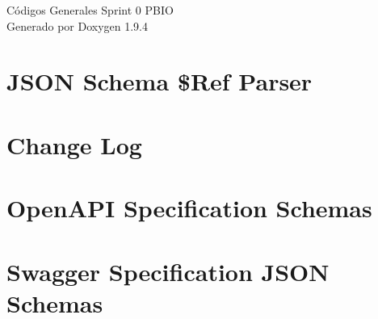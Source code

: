 \documentclass[twoside]{book}
\newcommand{\+}{\discretionary{\mbox{\scriptsize$\hookleftarrow$}}{}{}}
\newcommand{\clearemptydoublepage}{%
    \newpage{\pagestyle{empty}\cleardoublepage}%
  }
\begin{document}
  \raggedbottom
    \hypersetup{pageanchor=false,
                bookmarksnumbered=true,
                pdfencoding=unicode
               }
  \begin{titlepage}
  \vspace*{7cm}
  \begin{center}%
  {\Large Códigos Generales Sprint 0 PBIO}\\
  \vspace*{1cm}
  {\large Generado por Doxygen 1.9.4}\\
  \end{center}
  \end{titlepage}
  \clearemptydoublepage
  \tableofcontents
  \clearemptydoublepage
  \hypersetup{pageanchor=true}
\chapter{JSON Schema \$Ref Parser}
\label{md_src_nodejs_node_modules__apidevtools_json_schema_ref_parser_README}

\chapter{Change Log}
\label{md_src_nodejs_node_modules__apidevtools_openapi_schemas_CHANGELOG}

\chapter{Open\+API Specification Schemas}
\label{md_src_nodejs_node_modules__apidevtools_openapi_schemas_README}

\chapter{Swagger Specification JSON Schemas}
\label{md_src_nodejs_node_modules__apidevtools_openapi_schemas_schemas_v1_2_README}

\end{document}
